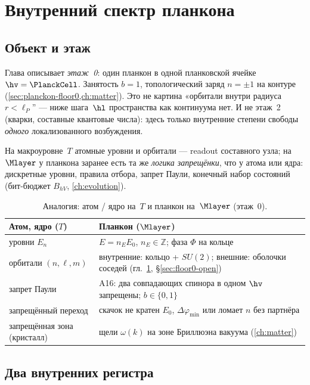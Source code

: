 \chapter{Внутренний спектр планкона}
\label{ch:floor0-spectrum}

\section{Объект и этаж}
\label{sec:floor0-object}

Глава описывает \emph{этаж~0}: один планкон в одной планковской ячейке~$\hv=\PlanckCell$.
Занятость $b=1$, топологический заряд $n=\pm1$ на контуре (\cref{sec:planckon-floor0,ch:matter}).
Это не картина «орбитали внутри радиуса $r<\ell_P$'' --- ниже шага~$\hl$ пространства как континуума нет.
И не этаж~2 (кварки, составные квантовые числа): здесь только внутренние степени свободы
\emph{одного} локализованного возбуждения.

На макроуровне~$T$ атомные уровни и орбитали --- readout составного узла;
на~$\Mlayer$ у планкона заранее есть та же \emph{логика запрещёнки},
что у атома или ядра: дискретные уровни, правила отбора, запрет Паули,
конечный набор состояний (бит-бюджет $B_{hV}$, \cref{ch:evolution}).

\begin{table}[htbp]
  \centering
  \caption{Аналогия: атом / ядро на~$T$ и планкон на~$\Mlayer$ (этаж~0).}
  \label{tab:floor0-analogy}
  \begin{tabular}{@{}ll@{}}
    \toprule
    Атом, ядро ($T$) & Планкон ($\Mlayer$) \\
    \midrule
    уровни $E_n$ & $E=n_E E_0$, $n_E\in\mathbb{Z}$; фаза $\Phi$ на кольце \\
    орбитали $(n,\ell,m)$ & внутренние: кольцо + $SU(2)$; внешние: оболочки соседей (гл.~\ref{ch:floor0-spectrum}, \S\ref{sec:floor0-open}) \\
    запрет Паули & A16: два совпадающих спинора в одном $\hv$ запрещены; $b\in\{0,1\}$ \\
    запрещённый переход & скачок не кратен $E_0$, $\Delta\varphi_{\min}$ или ломает $n$ без партнёра \\
    запрещённая зона (кристалл) & щели $\omega(k)$ на зоне Бриллюэна вакуума (\cref{ch:matter}) \\
    \bottomrule
  \end{tabular}
\end{table}

\section{Два внутренних регистра}
\label{sec:floor0-registers}

